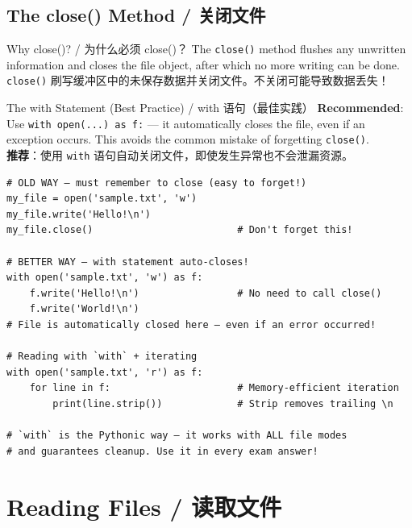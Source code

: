 \documentclass[11pt,a4paper]{report}
\let\oldtexttt\texttt
\renewcommand{\texttt}[1]{\textcolor{mainblue}{\oldtexttt{#1}}}
\begin{document}
\subsection{The close() Method / 关闭文件}

\begin{concept}{Why close()? / 为什么必须 close()？}
    The \texttt{close()} method flushes any unwritten information and closes the file object, after which no more writing can be done. \\
    \texttt{close()} 刷写缓冲区中的未保存数据并关闭文件。不关闭可能导致数据丢失！
\end{concept}

\begin{examplebox}{The with Statement (Best Practice) / with 语句（最佳实践）}
    \textbf{Recommended}: Use \texttt{with open(...) as f:} — it automatically closes the file, even if an exception occurs. This avoids the common mistake of forgetting \texttt{close()}. \\
    \textbf{推荐}：使用 \texttt{with} 语句自动关闭文件，即使发生异常也不会泄漏资源。
\begin{lstlisting}
# OLD WAY — must remember to close (easy to forget!)
my_file = open('sample.txt', 'w')
my_file.write('Hello!\n')
my_file.close()                         # Don't forget this!

# BETTER WAY — with statement auto-closes!
with open('sample.txt', 'w') as f:
    f.write('Hello!\n')                 # No need to call close()
    f.write('World!\n')
# File is automatically closed here — even if an error occurred!

# Reading with `with` + iterating
with open('sample.txt', 'r') as f:
    for line in f:                      # Memory-efficient iteration
        print(line.strip())             # Strip removes trailing \n

# `with` is the Pythonic way — it works with ALL file modes
# and guarantees cleanup. Use it in every exam answer!
\end{lstlisting}
\end{examplebox}

\section{Reading Files / 读取文件}
\end{document}
